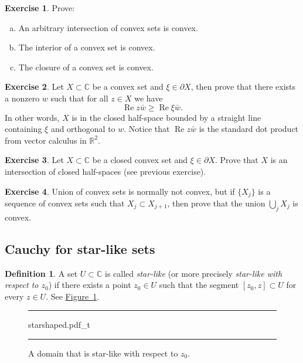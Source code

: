\documentclass[12pt,openany]{book}
\renewcommand{\Re}{\operatorname{Re}}
\newcommand{\C}{{\mathbb{C}}}
\newcommand{\R}{{\mathbb{R}}}
\newcommand{\myindex}[1]{#1\index{#1}}
\theoremstyle{plain}
\theoremstyle{remark}
\theoremstyle{definition}
\newtheorem{defn}[thm]{Definition}
\newenvironment{exbox}{%
    \def\FrameCommand{\vrule width 1pt \relax\hspace{10pt}}%
    \MakeFramed{\advance\hsize-\width\FrameRestore}%
}{%
    \endMakeFramed
}
\newenvironment{exparts}{%
    \leavevmode\begin{enumerate}[a),noitemsep,topsep=0pt,parsep=0pt,partopsep=0pt]
}{%
    \end{enumerate}
}
\newenvironment{myfig}{%
\begin{figure}[h!t]
\noindent\rule{\textwidth}{0.4pt}\vspace{12pt}\par\centering}%
{\par\noindent\rule{\textwidth}{0.4pt}
\end{figure}}
\theoremstyle{exercise}
\newtheorem{exercise}{Exercise}[section]
\theoremstyle{example}
\newcommand{\figureref}[1]{\hyperref[#1]{Figure~\ref*{#1}}}
\begin{document}
\begin{exbox}
\begin{exercise}
Prove:
\begin{exparts}
\item
An arbitrary intersection of convex sets is convex.
\item
The interior of a convex set is convex.
\item
The closure of a convex set is convex.
\end{exparts}
\end{exercise}

\begin{exercise}
Let $X \subset \C$ be a convex set and $\xi \in \partial X$, then prove that
there exists a nonzero $w$ such that for all $z \in X$ we have
\begin{equation*}
\Re z\bar{w} \geq \Re \xi\bar{w} .
\end{equation*}
In other words, $X$ is in the closed half-space
bounded by a straight line containing $\xi$ and
orthogonal to $w$.
Notice that $\Re z\bar{w}$ is the standard dot product from
vector calculus in $\R^2$.
\end{exercise}

\begin{exercise}
Let $X \subset \C$ be a closed convex set and $\xi \in \partial X$.
Prove that $X$ is an intersection of closed half-spaces (see previous
exercise).
\end{exercise}

\begin{exercise}
Union of convex sets is normally not convex, but if $\{ X_j \}$ is a
sequence of convex sets such that $X_j \subset X_{j+1}$, then
prove that the union $\bigcup_j X_j$ is convex.
\end{exercise}
\end{exbox}

\subsection{Cauchy for star-like sets}

\begin{defn}
A set $U \subset \C$ is called \emph{\myindex{star-like}} (or more precisely
\emph{star-like with respect to $z_0$}) if there exists a
point $z_0 \in U$ such that the segment $[z_0,z] \subset U$ for every
$z \in U$.  See \figureref{fig:starshaped}.
\end{defn}

\begin{myfig}
{starshaped.pdf_t}
\caption{A domain that is star-like with respect to $z_0$.\label{fig:starshaped}}
\end{myfig}
\end{document}
